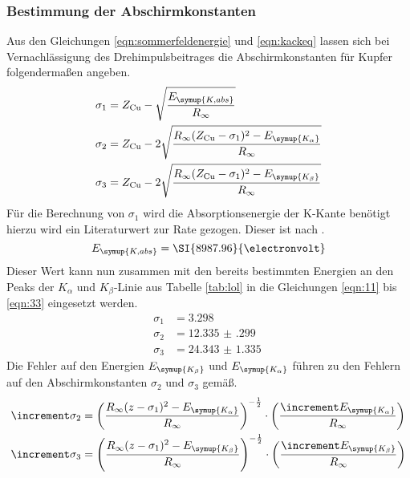 \subsubsection{Bestimmung der Abschirmkonstanten}
Aus den Gleichungen \eqref{eqn:sommerfeldenergie} und \eqref{eqn:kackeq} lassen sich bei Vernachlässigung des Drehimpulsbeitrages die Abschirmkonstanten für Kupfer folgendermaßen angeben.
\begin{align}
\label{eqn:11}
\sigma_1 &= Z_{\text{Cu}} - \sqrt{\frac{E_{\symup{K,abs}}}{R_{\infty}} } \\
\sigma_2 &= Z_{\text{Cu}} - 2 \sqrt{\frac{R_{\infty}(Z_{\text{Cu}} - \sigma_1)^2 - E_{\symup{K_{\alpha}}}}{R_{\infty}}} \\
\label{eqn:33}
\sigma_3 &= Z_{\text{Cu}} - 2 \sqrt{\frac{R_{\infty}(Z_{\text{Cu}} - \sigma_1)^2 - E_{\symup{K_{\beta}}}}{R_{\infty}}} 
\end{align}
Für die Berechnung von $\sigma_1$ wird die Absorptionsenergie der K-Kante benötigt hierzu wird ein Literaturwert zur Rate gezogen.
Dieser ist nach \cite{random}.
\begin{equation}
E_{\symup{K,abs}} = \SI{8987.96}{\electronvolt}
\end{equation}
Dieser Wert kann nun zusammen mit den bereits bestimmten Energien an den Peaks der $K_{\alpha}$ und $K_{\beta}$-Linie aus Tabelle \ref{tab:lol} in die Gleichungen \eqref{eqn:11} bis
\eqref{eqn:33} eingesetzt werden.
\begin{align}
\sigma_1 &= \SI{3.298}{}\\
\sigma_2 &= \SI{12.335(299)}{}\\
\sigma_3 &= \SI{24.343(1335)}{}
\end{align}
Die Fehler auf den Energien $E_{\symup{K_{\beta}}}$ und $E_{\symup{K_{\alpha}}}$ führen zu den Fehlern auf den Abschirmkonstanten $\sigma_{2}$ und $\sigma_{3}$ gemäß.
\begin{align*}
\increment \sigma_{2} &= \left( \frac{R_{\infty}(z - \sigma_{1})^{2} - E_{\symup{K_{\alpha}}}}{R_{\infty}}\right)^{-\frac{1}{2}} \cdot \left( \frac{\increment E_{\symup{K_{\alpha}}}}{R_{\infty}}\right) \\
\increment \sigma_{3} &= \left( \frac{R_{\infty}(z - \sigma_{1})^{2} - E_{\symup{K_{\beta}}}}{R_{\infty}}\right)^{-\frac{1}{2}} \cdot \left( \frac{\increment E_{\symup{K_{\beta}}}}{R_{\infty}}\right)
\end{align*}
